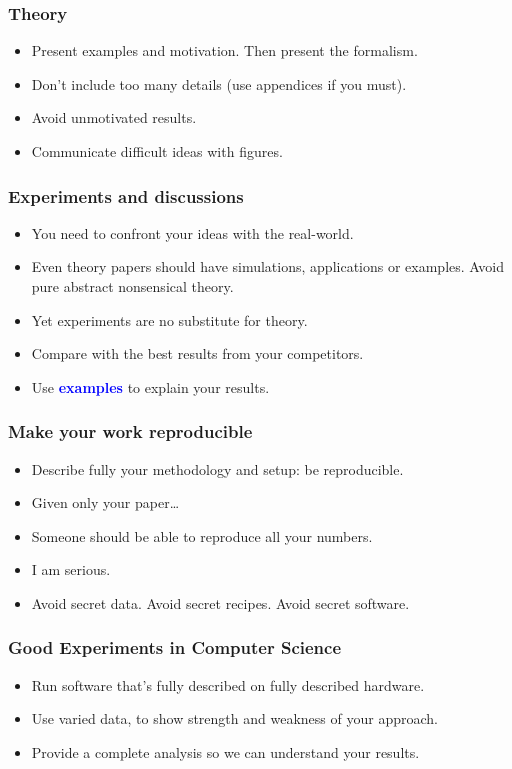 \documentclass[handout]{beamer}
\newcommand{\important}[1]{\textcolor{blue}{\textbf{#1}}}
\begin{document}
\frame
{
  \frametitle{Theory}

\begin{itemize}
  \item<1-> Present examples and motivation. Then present the formalism.
  \item<2-> Don't include too many details (use appendices if you must).
  \item<3-> Avoid unmotivated results.
  \item<4-> Communicate difficult ideas with figures.
\end{itemize}
}


\frame
{
  \frametitle{Experiments and discussions}

\begin{itemize}
 \item<1->You need to confront your ideas with the real-world.
  \item<2-> Even theory papers should have simulations, applications or examples. Avoid pure abstract nonsensical theory.
  \item<4-> Yet experiments are no substitute for theory.
  \item<5-> Compare with the best results from your competitors.
  \item<6-> Use \important{examples} to explain your results.
\end{itemize}
}


\frame
{
  \frametitle{Make your work reproducible}
 \begin{itemize}
  \item<1-> Describe fully your methodology and setup: be reproducible.
  \item<2->  Given only your paper\ldots
  \item<3->  Someone should be able to reproduce all your numbers.
  \item<4->  I am serious.
  \item<5-> Avoid secret data. Avoid secret
recipes. Avoid secret software.
 \end{itemize}
 }


\frame
{
  \frametitle{Good Experiments in Computer Science}

\begin{itemize}
 \item<1->Run software that's fully described on fully described hardware.
  \item<2->Use varied data, to show strength and weakness of your approach.
  \item<3->Provide a complete analysis so we can understand your results.
\end{itemize}
}
\end{document}
